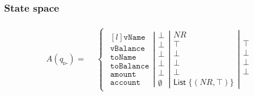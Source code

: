 \subsubsection{State space}\label{subsubsec:statespace}
\begin{align}
    A(q_{\whitepointerright})=
    \begin{split}
        &\left\{\begin{matrix}
                   \left.\begin{matrix*}[l]
                             \texttt{vName}\\
                             \texttt{vBalance}\\
                             \texttt{toName}\\
                             \texttt{toBalance}\\
                             \texttt{amount}\\
                             \texttt{account}
                   \end{matrix*}\right|
                   \left.\begin{matrix}
                             \bot\\
                             \bot\\
                             \bot\\
                             \bot\\
                             \bot\\
                             \emptyset
                   \end{matrix}\right|
                   \left.\begin{matrix}
                             NR\\
                             \top\\
                             \bot\\
                             \bot\\
                             \bot\\
                             \mathsf{List} \; \{(NR,\top)\}
                   \end{matrix}\right|
                   \left.\begin{matrix}
                             \top\\
                             \bot\\
                             \bot\\
                             \bot\\

\end{matrix}
\end{matrix}
\end{split}
\end{align}

